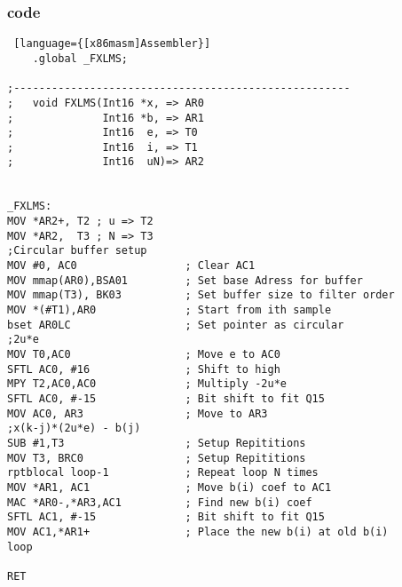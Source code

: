 \subsubsection{code}
\begin{lstlisting} [language={[x86masm]Assembler}]
	.global _FXLMS;

;-----------------------------------------------------    
;	void FXLMS(Int16 *x, => AR0
;			   Int16 *b, => AR1
;			   Int16  e, => T0
;			   Int16  i, => T1
;			   Int16  uN)=> AR2


_FXLMS:
MOV *AR2+, T2 ; u => T2
MOV *AR2,  T3 ; N => T3
;Circular buffer setup
MOV #0, AC0					; Clear AC1
MOV mmap(AR0),BSA01			; Set base Adress for buffer
MOV mmap(T3), BK03			; Set buffer size to filter order
MOV *(#T1),AR0				; Start from ith sample
bset AR0LC					; Set pointer as circular
;2u*e
MOV T0,AC0					; Move e to AC0			
SFTL AC0, #16				; Shift to high
MPY T2,AC0,AC0				; Multiply -2u*e
SFTL AC0, #-15				; Bit shift to fit Q15
MOV AC0, AR3				; Move to AR3
;x(k-j)*(2u*e) - b(j)
SUB #1,T3					; Setup Repititions
MOV T3, BRC0				; Setup Repititions
rptblocal loop-1			; Repeat loop N times
MOV *AR1, AC1				; Move b(i) coef to AC1
MAC *AR0-,*AR3,AC1			; Find new b(i) coef
SFTL AC1, #-15				; Bit shift to fit Q15
MOV AC1,*AR1+ 				; Place the new b(i) at old b(i) 
loop

RET
\end{lstlisting}
